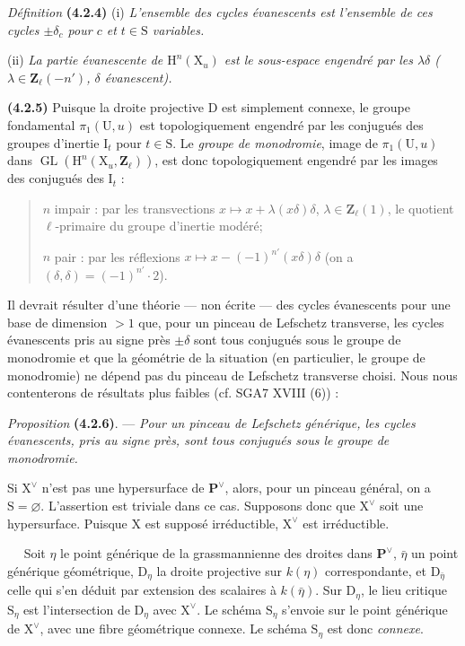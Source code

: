 \documentclass[11pt,leqno]{article}
\newcommand{\Page}[1]{\ifvmode\noindent\else\unskip\ \fi{\footnotesize\textcolor{gray}{[p.\,#1]}}\ \ignorespaces}
\begin{document}
\textit{Définition} \textbf{(4.2.4)} (i) \textit{L’ensemble des \textup{cycles évanescents} est l’ensemble de ces cycles \(\pm\delta_c\) pour \(c\) et \(t\in\mathrm{S}\) variables.}

(ii) \textit{La \textup{partie évanescente} de \(\mathrm{H}^n(\mathrm{X}_u)\) est le sous-espace engendré par les \(\lambda\delta\) (\(\lambda\in\mathbf{Z}_\ell(-n')\), \(\delta\) évanescent).}

\textbf{(4.2.5)} Puisque la droite projective \(\mathrm{D}\) est simplement connexe, le groupe fondamental \(\pi_1(\mathrm{U},u)\) est topologiquement engendré par les conjugués des groupes d’inertie \(\mathrm{I}_t\) pour \(t\in\mathrm{S}\). Le \textit{groupe de monodromie}, image de \(\pi_1(\mathrm{U},u)\) dans \(\operatorname{GL}(\mathrm{H}^n(\mathrm{X}_u,\mathbf{Z}_\ell))\), est donc topologiquement engendré par les images des conjugués des \(\mathrm{I}_t\) :
\begin{quote}
\(n\) impair : par les transvections \(x\mapsto x+\lambda(x\delta)\delta\), \(\lambda\in\mathbf{Z}_\ell(1)\), le quotient \(\ell\)-primaire du groupe d’inertie modéré;

\(n\) pair : par les réflexions \(x\mapsto x-(-1)^{n'}(x\delta)\delta\) (on a \((\delta,\delta)=(-1)^{n'}\cdot2\)).
\end{quote}

Il devrait résulter d’une théorie — non écrite — des cycles évanescents pour une base de dimension \(>1\) que, pour un pinceau de Lefschetz transverse, les cycles évanescents pris au signe près \(\pm\delta\) sont tous conjugués sous le groupe de monodromie et que la géométrie de la situation (en particulier, le groupe de monodromie) ne dépend pas du pinceau de Lefschetz transverse choisi. Nous nous contenterons de résultats plus faibles (cf. SGA7 XVIII (6)) :

\textit{Proposition} \textbf{(4.2.6)}. — \textit{Pour un pinceau de Lefschetz générique, les cycles évanescents, pris au signe près, sont tous conjugués sous le groupe de monodromie.}

Si \(\mathrm{X}^{\vee}\) n’est pas une hypersurface de \(\mathbf{P}^{\vee}\), alors, pour un pinceau général, on a \(\mathrm{S}=\varnothing\). L’assertion est triviale dans ce cas. Supposons donc que \(\mathrm{X}^{\vee}\) soit une hypersurface. Puisque \(\mathrm{X}\) est supposé irréductible, \(\mathrm{X}^{\vee}\) est irréductible.

\Page{221}
Soit \(\eta\) le point générique de la grassmannienne des droites dans \(\mathbf{P}^{\vee}\), \(\bar\eta\) un point générique géométrique, \(\mathrm{D}_\eta\) la droite projective sur \(k(\eta)\) correspondante, et \(\mathrm{D}_{\bar\eta}\) celle qui s’en déduit par extension des scalaires à \(k(\bar\eta)\). Sur \(\mathrm{D}_\eta\), le lieu critique \(\mathrm{S}_\eta\) est l’intersection de \(\mathrm{D}_\eta\) avec \(\mathrm{X}^{\vee}\). Le schéma \(\mathrm{S}_\eta\) s’envoie sur le point générique de \(\mathrm{X}^{\vee}\), avec une fibre géométrique connexe. Le schéma \(\mathrm{S}_\eta\) est donc \textit{connexe}.
\end{document}
